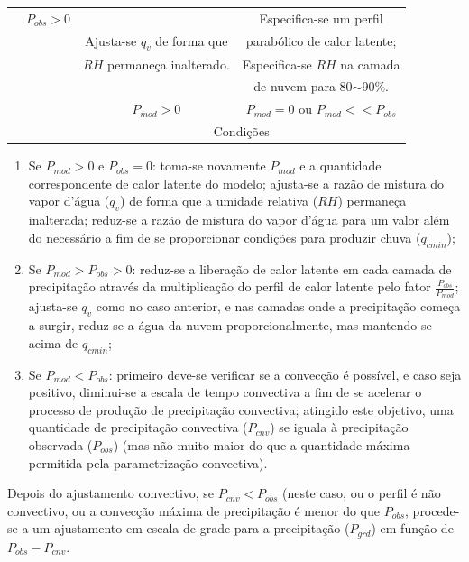 \begin{table}
\begin{tabular}{|c|c|c|c|}
\begin{sideways}
\end{sideways} & $P_{obs}>0$&  & Especifica-se um perfil\tabularnewline
\begin{sideways}

\end{sideways} &  & Ajusta-se $q_{v}$ de forma que & parabólico de calor latente;\tabularnewline
\begin{sideways}

\end{sideways} &  & $RH$ permaneça inalterado. & Especifica-se $RH$ na camada\tabularnewline
\begin{sideways}

\end{sideways} &  &  & de nuvem para 80$\sim$90\%.\tabularnewline
\hline
\multicolumn{1}{c}{} &  & $P_{mod}>0$ & $P_{mod}=0$ ou $P_{mod}<<P_{obs}$\tabularnewline
\cline{3-4} 
\multicolumn{1}{c}{} &  & \multicolumn{2}{c|}{Condições}\tabularnewline
\cline{3-4} 
\end{tabular}
\end{table}

\begin{enumerate}
\item Se $P_{mod}>0$ e $P_{obs}=0$: toma-se novamente $P_{mod}$ e a quantidade correspondente de calor latente do modelo; ajusta-se a razão de mistura do vapor d'água ($q_{v}$) de forma que a umidade relativa ($RH$) permaneça inalterada; reduz-se a razão de mistura do vapor d'água para um valor além do necessário a fim de se proporcionar condições para produzir chuva ($q_{cmin}$);
\item Se $P_{mod}>P_{obs}>0$: reduz-se a liberação de calor latente em cada camada de precipitação através da multiplicação do perfil de calor latente pelo fator $\frac{P_{obs}}{P_{mod}}$; ajusta-se $q_{v}$ como no caso anterior, e nas camadas onde a precipitação começa a surgir, reduz-se a água da nuvem proporcionalmente, mas mantendo-se acima de $q_{cmin}$;
\item Se $P_{mod}<P_{obs}$: primeiro deve-se verificar se a convecção é possível, e caso seja positivo, diminui-se a escala de tempo convectiva a fim de se acelerar o processo de produção de precipitação convectiva; atingido este objetivo, uma quantidade de precipitação convectiva ($P_{cnv}$) se iguala à precipitação observada ($P_{obs}$) (mas não muito maior do que a quantidade máxima permitida pela parametrização convectiva).
\end{enumerate}

Depois do ajustamento convectivo, se $P_{cnv}<P_{obs}$ (neste caso, ou o perfil é não convectivo, ou a convecção máxima de precipitação é menor do que $P_{obs}$, procede-se a um ajustamento em escala de grade para a precipitação ($P_{grd}$) em função de $P_{obs}-P_{cnv}$.

